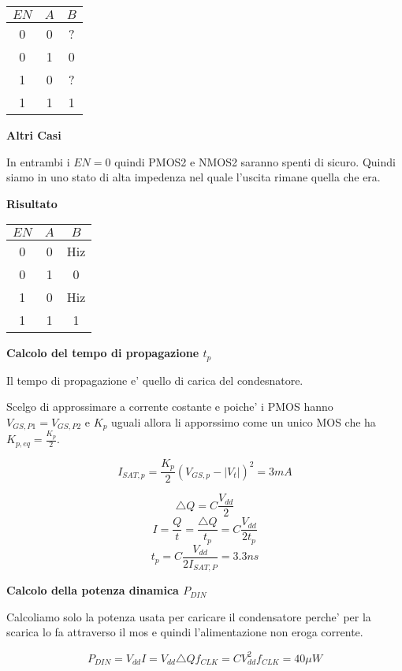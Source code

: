 \documentclass[\main/main.tex]{subfiles}
\begin{document}
\begin{center}
    \begin{tabular}{ c  c | c}
        $EN$ & $A$ & $B$ \\
        \hline
        0    & 0   & ?   \\
        0    & 1   & 0   \\
        1    & 0   & ?   \\
        1    & 1   & 1   \\
    \end{tabular}
\end{center}

\textbf{Altri Casi}

In entrambi i $EN = 0$ quindi PMOS2 e NMOS2 saranno spenti di sicuro.
Quindi siamo in uno stato di alta impedenza nel quale l'uscita rimane quella che era.

\textbf{Risultato}
\begin{center}
    \begin{tabular}{ c  c | c}
        $EN$ & $A$ & $B$ \\
        \hline
        0    & 0   & Hiz \\
        0    & 1   & 0   \\
        1    & 0   & Hiz \\
        1    & 1   & 1   \\
    \end{tabular}
\end{center}

\textbf{Calcolo del tempo di propagazione $t_p$}

Il tempo di propagazione e' quello di carica del condesnatore.

Scelgo di approssimare a corrente costante e poiche' i PMOS hanno $V_{GS,P1} = V_{GS,P2}$ e $K_p$ uguali allora li apporssimo come un unico MOS che ha $K_{p,eq} =  \frac{K_p}{2}$.

\[I_{SAT,p} = \frac{K_p}{2} \left( V_{GS,p} - |V_t| \right)^2 = 3mA\]

\[ \triangle Q = C \frac{V_{dd}}{2} \]
\[ I = \frac{Q}{t} = \frac{\triangle Q}{t_p} = C \frac{V_{dd}}{2 t_p} \]
\[ t_p = C \frac{V_{dd}}{2 I_{SAT,P}} = 3.3ns\]

\textbf{Calcolo della potenza dinamica $P_{DIN}$}

Calcoliamo solo la potenza usata per caricare il condensatore perche' per la scarica lo fa attraverso il mos e quindi l'alimentazione non eroga corrente.

\[P_{DIN} = V_{dd} I = V_{dd} \triangle Q f_{CLK} = C V_{dd}^2 f_{CLK} = 40 \mu W\]
\end{document}

